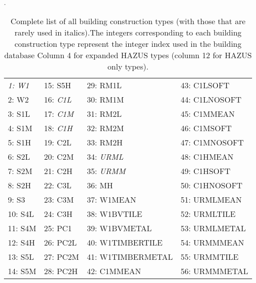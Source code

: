 \begin{table}[htp]
\centering \caption{Complete list of all building construction
types (with those that are rarely used in italics).The integers
corresponding to each building construction type represent the
integer index used in the building database Column 4 for expanded HAZUS types (column 12 for HAZUS
only types).} \vspace{0.8em} \label{tab:v-dam-allbtypes}.
\begin{tabular}{|llll|}
 \hline
\it 1: W1 &   15: S5H &     29: RM1L &           43: C1LSOFT  \\
    2: W2 &   16: \it C1L & 30: RM1M &           44: C1LNOSOFT \\
    3: S1L &  17: \it C1M & 31: RM2L &           45: C1MMEAN \\
    4: S1M &  18: \it C1H & 32: RM2M          &  46: C1MSOFT \\
    5: S1H &  19: C2L &     33: RM2H         &   47: C1MNOSOFT \\
    6: S2L &  20: C2M &     34: \it URML      &  48: C1HMEAN    \\
    7: S2M &  21: C2H &     35: \it URMM     &   49: C1HSOFT \\
    8: S2H &  22: C3L &     36: MH &             50: C1HNOSOFT \\
    9: S3 &   23: C3M &     37: W1MEAN &         51: URMLMEAN \\
    10: S4L & 24: C3H &     38: W1BVTILE&        52: URMLTILE  \\
    11: S4M & 25: PC1 &     39: W1BVMETAL&       53: URMLMETAL \\
    12: S4H & 26: PC2L &    40: W1TIMBERTILE  &  54: URMMMEAN \\
    13: S5L & 27: PC2M &    41: W1TIMBERMETAL  & 55: URMMTILE  \\
    14: S5M & 28: PC2H &    42: C1MMEAN       &  56: URMMMETAL \\
 \hline
\end{tabular}
\end{table}


